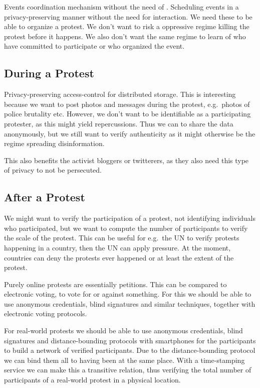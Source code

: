 \documentclass[a4paper]{llncs}
\begin{document}
Events coordination mechanism without the need of .
Scheduling events in a privacy-preserving manner without the need for 
interaction.
We need these to be able to organize a protest.
We don't want to risk a oppressive regime killing the protest before it 
happens.
We also don't want the same regime to learn of who have committed to 
participate or who organized the event.


\subsection{During a Protest}

Privacy-preserving access-control for distributed storage.
This is interesting because we want to post photos and messages during the 
protest, e.g.\ photos of police brutality etc.
However, we don't want to be identifiable as a participating protester, as this 
might yield repercussions.
Thus we can to share the data anonymously, but we still want to verify 
authenticity as it might otherwise be the regime spreading disinformation.

This also benefits the activist bloggers or twitterers, as they also need this 
type of privacy to not be persecuted.


\subsection{After a Protest}

We might want to verify the participation of a protest, not identifying 
individuals who participated, but we want to compute the number of participants 
to verify the scale of the protest.
This can be useful for e.g.\ the UN to verify protests happening in a country, 
then the UN can apply pressure.
At the moment, countries can deny the protests ever happened or at least the 
extent of the protest.

Purely online protests are essentially petitions.
This can be compared to electronic voting, to vote for or against something.
For this we should be able to use anonymous credentials, blind signatures and 
similar techniques, together with electronic voting protocols.

For real-world protests we should be able to use anonymous credentials, blind 
signatures and distance-bounding protocols with smartphones for the 
participants to build a network of verified participants.
Due to the distance-bounding protocol we can bind them all to having been at 
the same place.
With a time-stamping service we can make this a transitive relation, thus 
verifying the total number of participants of a real-world protest in 
a physical location.
\end{document}
